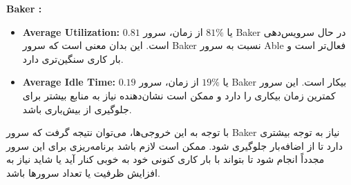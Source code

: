 \textbf{Baker :}
\begin{itemize}
	\item \textbf{Average Utilization:} \(0.81\) یا \(81\%\) از زمان، سرور Baker در حال سرویس‌دهی است. این بدان معنی است که سرور Baker نسبت به سرور Able فعال‌تر است و بار کاری سنگین‌تری دارد.
	\item \textbf{Average Idle Time:} \(0.19\) یا \(19\%\) از زمان، سرور Baker بیکار است. این سرور کمترین زمان بیکاری را دارد و ممکن است نشان‌دهنده نیاز به منابع بیشتر برای جلوگیری از بیش‌باری باشد.
\end{itemize}

با توجه به این خروجی‌ها، می‌توان نتیجه گرفت که سرور Baker نیاز به توجه بیشتری دارد تا از اضافه‌بار جلوگیری شود. ممکن است لازم باشد برنامه‌ریزی برای این سرور مجدداً انجام شود تا بتواند با بار کاری کنونی خود به خوبی کنار آید یا شاید نیاز به افزایش ظرفیت یا تعداد سرورها باشد.
